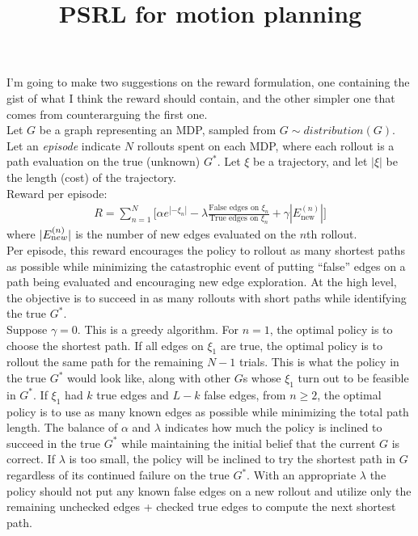 \documentclass[10pt]{article}
\title{PSRL for motion planning}
\date{}
\begin{document}
\maketitle 

\noindent I'm going to make two suggestions on the reward formulation, one containing the gist of what I think the reward should contain, and the other simpler one that comes from counterarguing the first one. \\


\noindent Let $G$ be a graph representing an MDP, sampled from $G \sim distribution(G)$. Let an {\it episode} indicate $N$ rollouts spent on each MDP, where each rollout is a path evaluation on the true (unknown) $G^*$. Let $\xi$ be a trajectory, and let $|\xi|$ be the length (cost) of the trajectory.\\ 

\noindent Reward per episode:
\begin{align*}
R = \sum_{n=1}^N \bigg[\alpha e^{|-\xi_n|} - \lambda \frac{\text {False edges on $\xi_n$}}{\text{True edges on $\xi_n$}} + \gamma |E_\text{new}^{(n)}|\bigg]
\end{align*}
where $|E_{\text new}^{(n)}|$ is the number of new edges evaluated on the $n$th rollout.\\


\noindent Per episode, this reward encourages the policy to rollout as many shortest paths as possible while minimizing the catastrophic event of putting ``false'' edges on a path being evaluated and encouraging new edge exploration. At the high level, the objective is to succeed in as many rollouts with short paths while identifying the true $G^*$. \\


\noindent Suppose $\gamma=0$. This is a greedy algorithm. For $n=1$, the optimal policy is to choose the shortest path. If all edges on $\xi_1$ are true, the optimal policy is to rollout the same path for the remaining $N-1$ trials. This is what the policy in the true $G^*$ would look like, along with other $G$s whose $\xi_1$ turn out to be feasible in $G^*$.  If $\xi_1$ had $k$ true edges and $L - k$ false edges, from $n\geq 2$, the optimal policy is to use as many known edges as possible while minimizing the total path length. The balance of $\alpha$ and $\lambda$ indicates how much the policy is inclined to succeed in the true $G^*$ while maintaining the initial belief that the current $G$ is correct. If $\lambda$ is too small, the policy will be inclined to try the shortest path in $G$ regardless of its continued failure on the true $G^*$. With an appropriate $\lambda$ the policy should not put any known false edges on a new rollout and utilize only the remaining unchecked edges + checked true edges to compute the next shortest path.\\
\end{document}
